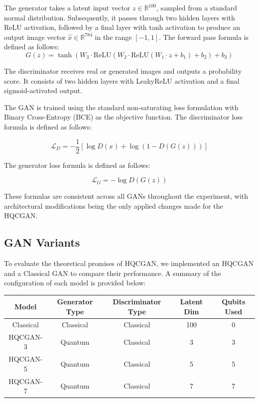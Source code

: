 The generator takes a latent input vector \( z \in \mathbb{R}^{100} \), sampled from a standard normal distribution. Subsequently, it passes through two hidden layers with ReLU activation, followed by a final layer with tanh activation to produce an output image vector \( \hat{x} \in \mathbb{R}^{784} \) in the range $[-1, 1]$. The forward pass formula is defined as follows:
\begin{equation}
G(z) = \tanh(W_3 \cdot \text{ReLU}(W_2 \cdot \text{ReLU}(W_1 \cdot z + b_1) + b_2) + b_3)
\end{equation}

The discriminator receives real or generated images and outputs a probability score. It consists of two hidden layers with LeakyReLU activation and a final sigmoid-activated output.

The GAN is trained using the standard non-saturating loss formulation with Binary Cross-Entropy (BCE) as the objective function. The discriminator loss formula is defined as follows:

\begin{equation}
\mathcal{L}_D = -\frac{1}{2} \left[\log D(x) + \log \left(1 - D(G(z))\right)\right]
\end{equation}

The generator loss formula is defined as follows:

\begin{equation}
\mathcal{L}_G = -\log D(G(z))
\end{equation}

These formulas are consistent across all GANs throughout the experiment, with architectural modifications being the only applied changes made for the HQCGAN.
\newpage
\subsection{GAN Variants}

To evaluate the theoretical promises of HQCGAN, we implemented an HQCGAN and a Classical GAN to compare their performance. A summary of the configuration of each model is provided below:

\begin{center}
\begin{tabular}{|c|c|c|c|c|}
\hline
\textbf{Model} & \textbf{Generator Type} & \textbf{Discriminator Type} & \textbf{Latent Dim} & \textbf{Qubits Used} \\
\hline
Classical & Classical & Classical & 100 & 0 \\
HQCGAN-3    & Quantum   & Classical & 3   & 3 \\
HQCGAN-5    & Quantum   & Classical & 5   & 5 \\
HQCGAN-7    & Quantum   & Classical & 7   & 7 \\
\hline
\end{tabular}
\end{center}

